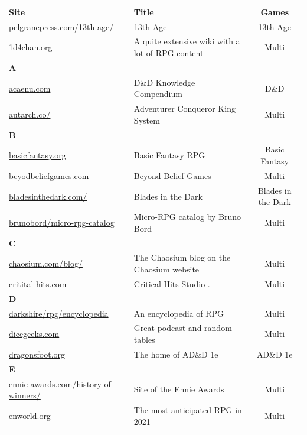 \documentclass[a4paper, 11pt, twoside]{article}
\begin{document}
\begin{longtable}{llc}
\textbf{Site} & \textbf{Title} & \textbf{Games}\\
\href{http://site.pelgranepress.com/index.php/category/products/13th-age/}{pelgranepress.com/13th-age/} & 13th Age & 13th Age\\
\href{https://1d4chan.org/}{1d4chan.org} & A quite extensive wiki with a lot of RPG content & Multi\\
\textbf{A} &  & \\
\href{https://www.acaeum.com}{acaenu.com} & D\&D Knowledge Compendium & D\&D\\
\href{https://www3.autarch.co/}{autarch.co/} & Adventurer Conqueror King System & Multi\\
\textbf{B} &  & \\
\href{https://www.basicfantasy.org}{basicfantasy.org} & Basic Fantasy RPG & Basic Fantasy\\
\href{https://beyondbeliefgames.webs.com/}{beyodbeliefgames.com} & Beyond Belief Games & Multi\\
\href{https://bladesinthedark.com/}{bladesinthedark.com/} & Blades in the Dark & Blades in the Dark\\
\href{https://github.com/brunobord/micro-rpg-catalog}{brunobord/micro-rpg-catalog} & Micro-RPG catalog by Bruno Bord & Multi\\
\textbf{C} &  & \\
\href{https://www.chaosium.com/blog/}{chaosium.com/blog/} & The Chaosium blog on the Chaosium website & Multi\\
\href{http://www.critical-hits.com/}{critital-hits.com} & Critical Hits Studio                                                                 . & Multi\\
\textbf{D} &  & \\
\href{https://www.darkshire.net/jhkim/rpg/encyclopedia/}{darkshire/rpg/encyclopedia} & An encyclopedia of RPG & Multi\\
\href{https://dicegeeks.com}{dicegeeks.com} & Great podcast and random tables & Multi\\
\href{https://www.dragonsfoot.org}{dragonsfoot.org} & The home of AD\&D 1e & AD\&D 1e\\
\textbf{E} &  & \\
\href{https://ennie-awards.com/history-of-winners/}{ennie-awards.com/history-of-winners/} & Site of the Ennie Awards & Multi\\
\href{https://www.enworld.org/threads/the-10-most-anticipated-tabletop-rpgs-of-2021.677397/}{enworld.org} & The most anticipated RPG in 2021 & Multi\\

\end{longtable}
\end{document}
